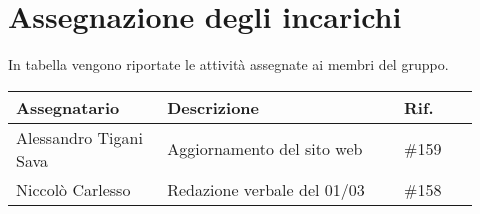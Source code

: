 \newpage
\section{Assegnazione degli incarichi}
In tabella vengono riportate le attività assegnate ai membri del gruppo.
\begin{center}
	{
		\renewcommand{\arraystretch}{1.5}
		\begin{tabular}{p{0.30\linewidth}|p{0.47\linewidth}|p{0.15\linewidth}}
			\textbf{Assegnatario}  & \textbf{Descrizione}        & \textbf{Rif.} \\
			\hline
			Alessandro Tigani Sava & Aggiornamento del sito web  & \#159         \\
			\hline
			Niccolò Carlesso       & Redazione verbale del 01/03 & \#158         \\
			\hline
		\end{tabular}
	}
\end{center}

